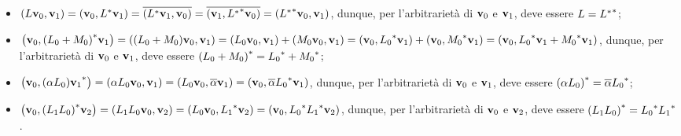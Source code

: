 \begin{itemize}
  \item $\left ( L\mathbf{v}_0 , \mathbf{v}_1 \right )
    = \left ( \mathbf{v}_0 , {L}^*\mathbf{v}_1 \right )
    = \overline{\left ( {L}^*\mathbf{v}_1 , \mathbf{v}_0 \right )}
    = \overline{\left ( \mathbf{v}_1 , {{L}^*}^*\mathbf{v}_0 \right )}
    = \left ( {{L}^*}^*\mathbf{v}_0 , \mathbf{v}_1 \right )$,
    dunque, per l'arbitrariet\`a di $\mathbf{v}_0$ e $\mathbf{v}_1$, deve essere
    $L = {{L}^*}^*$;
  \item $\left ( \mathbf{v}_0 , {(L_0 + M_0)}^*\mathbf{v}_1 \right )
    = \left ( (L_0 + M_0)\mathbf{v}_0 , \mathbf{v}_1 \right )
    = \left ( L_0\mathbf{v}_0 , \mathbf{v}_1 \right )
      + \left ( M_0\mathbf{v}_0 , \mathbf{v}_1 \right )
    = \left ( \mathbf{v}_0 , {L_0}^*\mathbf{v}_1 \right )
      + \left ( \mathbf{v}_0 , {M_0}^*\mathbf{v}_1 \right )
    = \left ( \mathbf{v}_0 , {L_0}^*\mathbf{v}_1 + {M_0}^*\mathbf{v}_1 \right )$,
    dunque, per l'arbitrariet\`a di $\mathbf{v}_0$ e $\mathbf{v}_1$, deve essere
    ${(L_0 + M_0)}^*
      = {L_0}^* + {M_0}^*$;
  \item $\left ( \mathbf{v}_0 , {(\alpha L_0)\mathbf{v}_1}^* \right )
    = \left ( \alpha L_0\mathbf{v}_0 , \mathbf{v}_1 \right )
    = \left ( L_0\mathbf{v}_0 , \overline{\alpha}\mathbf{v}_1 \right )
   =\left ( \mathbf{v}_0 , \overline{\alpha}{L_0}^*\mathbf{v}_1 \right )$,
    dunque, per l'arbitrariet\`a di $\mathbf{v}_0$ e $\mathbf{v}_1$, deve essere
    ${(\alpha L_0)}^* = \overline{\alpha}{L_0}^*$;
  \item $\left ( \mathbf{v}_0 , {(L_1L_0)}^*\mathbf{v}_2 \right )
    = \left ( L_1L_0\mathbf{v}_0 , \mathbf{v}_2 \right )
    = \left ( L_0\mathbf{v}_0 , {L_1}^*\mathbf{v}_2 \right )
    =\left ( \mathbf{v}_0 , {L_0}^*{L_1}^*\mathbf{v}_2 \right )$,
    dunque, per l'arbitrariet\`a di $\mathbf{v}_0$ e $\mathbf{v}_2$, deve essere
    ${(L_1L_0)}^* = {L_0}^*{L_1}^*$.
    \EndProof
\end{itemize}
